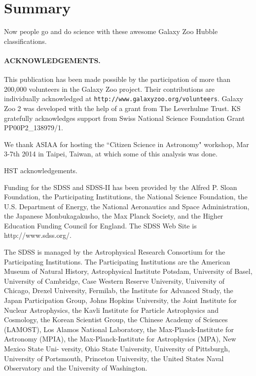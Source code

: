 \documentclass[usenatbib]{mn2e}
\begin{document}
\section{Summary}

Now people go and do science with these awesome Galaxy Zoo Hubble classifications.  
 
 
\paragraph*{ACKNOWLEDGEMENTS.} 

This publication has been made possible by the participation of more than 200,000 volunteers in the Galaxy Zoo project. Their contributions are individually acknowledged at \texttt{http://www.galaxyzoo.org/volunteers}. Galaxy Zoo 2 was developed with the help of a grant from The Leverhulme Trust. KS gratefully acknowledges support from Swiss National Science Foundation Grant PP00P2\_138979/1.

We thank ASIAA for hosting the ``Citizen Science in Astronomy" workshop, Mar 3-7th 2014 in Taipei, Taiwan, at which some of this analysis was done. 

HST acknowledgements.

Funding for the SDSS and SDSS-II has been provided by the Alfred P. Sloan Foundation, the Participating Institutions, the National Science Foundation, the U.S. Department of Energy, the National Aeronautics and Space Administration, the Japanese Monbukagakusho, the Max Planck Society, and the Higher Education Funding Council for England. The SDSS Web Site is http://www.sdss.org/. 

The SDSS is managed by the Astrophysical Research Consortium for the Participating Institutions. The Participating Institutions are the American Museum of Natural History, Astrophysical  Institute Potsdam, University of Basel, University of Cambridge, 
Case Western Reserve University, University of Chicago, Drexel University, Fermilab, the Institute for Advanced Study, the Japan 
Participation Group, Johns Hopkins University, the Joint Institute for Nuclear Astrophysics, the Kavli Institute for Particle Astrophysics and Cosmology, the Korean Scientist Group, the Chinese Academy of Sciences (LAMOST), Los Alamos National Laboratory, the Max-Planck-Institute for Astronomy (MPIA), the Max-Planck-Institute for Astrophysics (MPA), New Mexico State Uni- 
versity, Ohio State University, University of Pittsburgh, University of Portsmouth, Princeton University, the United States Naval Observatory and the University of Washington. 


\begin{thebibliography}{}

\end{thebibliography}
\end{document}
